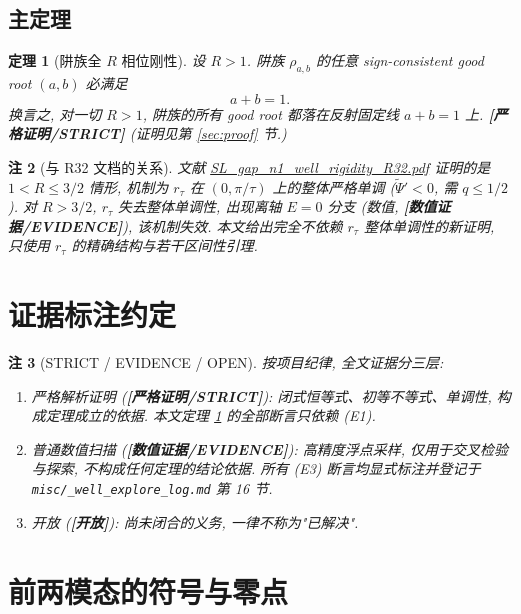 \documentclass[UTF8]{ctexart}
\newtheorem{theorem}{定理}[section]
\newtheorem{remark}[theorem]{注}
\newcommand{\STRICT}{\textbf{[严格证明/STRICT]}}
\newcommand{\EVID}{\textbf{[数值证据/EVIDENCE]}}
\newcommand{\OPEN}{\textbf{[开放]}}
\begin{document}
\subsection{主定理}

\begin{theorem}[阱族全 $R$ 相位刚性]\label{thm:main}
	设 $R>1$. 阱族 $\rho_{a,b}$ 的任意 sign-consistent good root $(a,b)$ 必满足
	\begin{equation}
		a+b=1.
		\label{eq:sym}
	\end{equation}
	换言之, 对\emph{一切} $R>1$, 阱族的所有 good root 都落在反射固定线
	$a+b=1$ 上. \STRICT{} (证明见第 \ref{sec:proof} 节.)
\end{theorem}

\begin{remark}[与 R32 文档的关系]
	文献 \url{SL\_gap\_n1\_well\_rigidity\_R32.pdf} 证明的是 $1<R\le3/2$
	情形, 机制为 $r_\tau$ 在 $(0,\pi/\tau)$ 上的整体严格单调
	($\widetilde\Psi'<0$, 需 $q\le1/2$). 对 $R>3/2$, $r_\tau$ 失去整体单调性,
	出现离轴 $E=0$ 分支 (数值, \EVID), 该机制失效. 本文给出完全不依赖
	$r_\tau$ 整体单调性的新证明, 只使用 $r_\tau$ 的精确结构与若干区间性引理.
\end{remark}

\section{证据标注约定}\label{sec:evidence}

\begin{remark}[STRICT / EVIDENCE / OPEN]\label{rem:evidence}
	按项目纪律, 全文证据分三层:
	\begin{enumerate}
		\item[(E1)] \emph{严格解析证明} (\STRICT): 闭式恒等式、初等不等式、单调性,
			构成定理成立的依据. 本文定理 \ref{thm:main} 的全部断言只依赖 (E1).
		\item[(E3)] \emph{普通数值扫描} (\EVID): 高精度浮点采样, 仅用于交叉检验
			与探索, 不构成任何定理的结论依据. 所有 (E3) 断言均显式标注并登记于
			\texttt{misc/\_well\_explore\_log.md} 第 16 节.
		\item[(E2)] \emph{开放} (\OPEN): 尚未闭合的义务, 一律不称为"已解决".
	\end{enumerate}
\end{remark}

\section{前两模态的符号与零点}\label{sec:modes}
\end{document}
